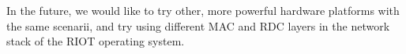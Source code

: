 \documentclass[conference]{IEEEtran}
\begin{document}
\bigskip

In the future, we would like to try other, more powerful hardware platforms
with the same scenarii, and try using different MAC and RDC layers in
the network stack of the RIOT operating system.





\vfill

{\small
}
\end{document}
